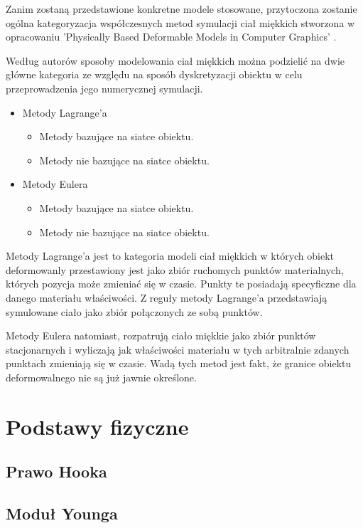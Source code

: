 Zanim zostaną przedstawione konkretne modele stosowane, przytoczona 
zostanie ogólna kategoryzacja współczesnych metod symulacji ciał miękkich
stworzona w opracowaniu 'Physically Based Deformable Models in Computer
Graphics' \cite{pbdo}.

Według autorów sposoby modelowania ciał miękkich można
podzielić na dwie główne kategoria ze względu na sposób dyskretyzacji
obiektu w celu przeprowadzenia jego numerycznej symulacji.
\begin{itemize}
\item Metody Lagrange'a
\begin{itemize}
\item Metody bazujące na siatce obiektu.
\item Metody nie bazujące na siatce obiektu.
\end{itemize}
\item Metody Eulera
\begin{itemize}
\item Metody bazujące na siatce obiektu.
\item Metody nie bazujące na siatce obiektu.
\end{itemize}
\end{itemize}

Metody Lagrange'a jest to kategoria modeli ciał miękkich w których obiekt
deformowanly przestawiony jest jako zbiór ruchomych punktów materialnych,
 których pozycja może zmieniać się w czasie. Punkty te posiadają
 specyficzne dla danego materiału właściwości. Z reguły metody
 Lagrange'a przedstawiają symulowane ciało jako zbiór połączonych ze
 sobą punktów.
 
Metody Eulera natomiast, rozpatrują ciało miękkie jako zbiór punktów
stacjonarnych i wyliczają jak właściwości materiału w tych arbitralnie zdanych
punktach zmieniają się w czasie. Wadą tych metod jest fakt, że granice obiektu
deformowalnego nie są już jawnie określone.\cite{pbdo}

\section{Podstawy fizyczne}
\subsection{Prawo Hooka}
\subsection{Moduł Younga}

